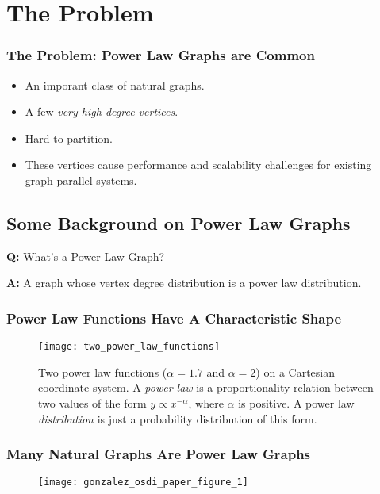 \section{The Problem}

\begin{frame}
  \frametitle{The Problem: Power Law Graphs are Common}
  \begin{itemize}
      \item An imporant class of natural graphs.
      \item A few \textit{very high-degree vertices}.
      \item Hard to partition.
      \item These vertices cause performance and scalability challenges for
            existing graph-parallel systems.
  \end{itemize}
\end{frame}

\subsection{Some Background on Power Law Graphs}

\begin{frame}
    \textbf{Q:} What's a Power Law Graph?

    \textbf{A:} A graph whose vertex degree distribution is a power law
    distribution.
\end{frame}

\begin{frame}
  \frametitle{Power Law Functions Have A Characteristic Shape}
  \begin{figure}
    \centering
    \texttt{[image: two\_power\_law\_functions]}
    \caption{Two power law functions ($\alpha = 1.7$ and $\alpha = 2$) on a
             Cartesian coordinate system. A \textit{power law} is a
             proportionality relation between two values of the form
             $y \propto x^{-\alpha}$, where $\alpha$ is positive. A power law
             \textit{distribution} is just a probability distribution of this
             form.}
  \end{figure}
\end{frame}

\begin{frame}
  \frametitle{Many Natural Graphs Are Power Law Graphs}
  \begin{figure}
    \centering
    \texttt{[image: gonzalez\_osdi\_paper\_figure\_1]}
    \caption{\cite[OSDI '12]{gonzalez2012powergraph}}
  \end{figure}
\end{frame}

